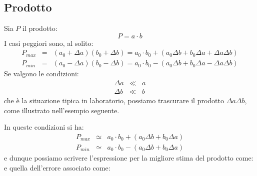\subsection{Prodotto}
Sia $P$ il prodotto:
$$
P=a \cdot b
$$
I casi peggiori sono, al solito:
\begin{eqnarray*}
P_{max} & = & (a_0+\Delta a)(b_0+\Delta b) =
a_0 \cdot b_0 + (a_0\Delta b + b_0\Delta a + \Delta a\Delta b)\\
P_{min} & = & (a_0-\Delta a)(b_0-\Delta b) =
a_0 \cdot b_0 - (a_0\Delta b + b_0\Delta a - \Delta a\Delta b)
\end{eqnarray*}
Se valgono le condizioni:
\begin{eqnarray*}
\Delta a & \ll & a\\
\Delta b & \ll & b
\end{eqnarray*}
che \`e la situazione tipica in laboratorio, possiamo trascurare il prodotto
$\Delta a\Delta b$, come illustrato nell'esempio seguente.


\begin{exemplify}


\end{exemplify}

\noindent In queste condizioni si ha:
\begin{eqnarray*}
P_{max} & \simeq & a_0 \cdot b_0 + (a_0\Delta b + b_0\Delta a)\\
P_{min} & \simeq & a_0 \cdot b_0 - (a_0\Delta b + b_0\Delta a)
\end{eqnarray*}
e dunque possiamo scrivere l'espressione per la migliore stima del prodotto
come:
e quella dell'errore associato come:


